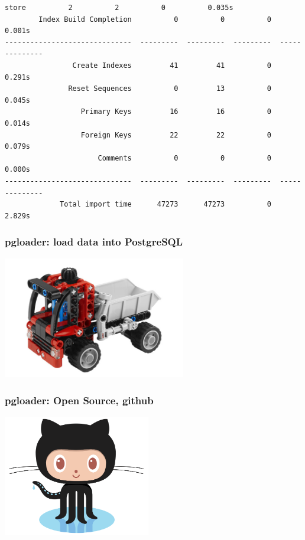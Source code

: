 \documentclass{beamer}
\begin{document}
\begin{frame}[fragile]
\begin{Verbatim}[fontsize=\tiny]
                         store          2          2          0          0.035s
        Index Build Completion          0          0          0          0.001s
------------------------------  ---------  ---------  ---------  --------------
                Create Indexes         41         41          0          0.291s
               Reset Sequences          0         13          0          0.045s
                  Primary Keys         16         16          0          0.014s
                  Foreign Keys         22         22          0          0.079s
                      Comments          0          0          0          0.000s
------------------------------  ---------  ---------  ---------  --------------
             Total import time      47273      47273          0          2.829s
\end{Verbatim}
\end{frame}

\begin{frame}
  \frametitle{pgloader: load data into PostgreSQL}


  \begin{center}
    \includegraphics[height=2.1in]{pgloader.jpg}
  \end{center}
\end{frame}

\begin{frame}
  \frametitle{pgloader: Open Source, github}


  \begin{center}
    \includegraphics[height=2.1in]{Octocat.png}
  \end{center}
\end{frame}
\end{document}
